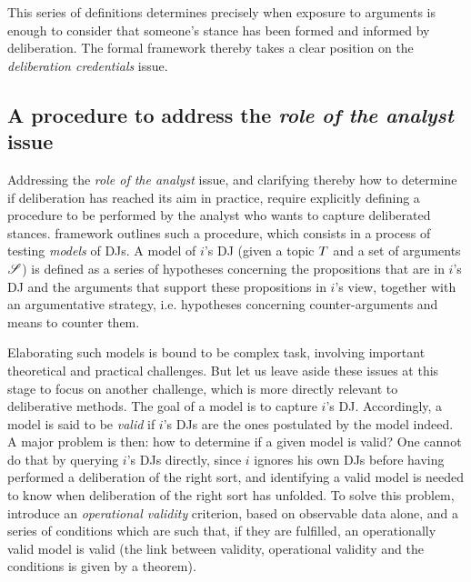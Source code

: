 \documentclass[version=3.21, pagesize, twoside=off, bibliography=totoc, DIV=calc, fontsize=12pt, a4paper, french, english]{scrartcl}
\begin{document}
{This series of definitions determines precisely when exposure to arguments is enough to consider that someone’s stance has been formed and informed by deliberation. The formal framework thereby takes a clear position on the \emph{deliberation credentials} issue.

\subsection{A procedure to address the \emph{role of the analyst} issue}
Addressing the \emph{role of the analyst} issue, and clarifying thereby how to determine if deliberation has reached its aim in practice,  require explicitly defining a procedure to be performed by the analyst who wants to capture deliberated stances.  framework outlines such a procedure, which consists in a process of testing \emph{models} of \acp{DJ}. A model of $i$'s \ac{DJ} (given a topic $T$ and a set of arguments $\mathscr{S}$) is defined as a series of hypotheses concerning the propositions that are in $i$'s \ac{DJ} and the arguments that support these propositions in $i$'s view, together with an argumentative strategy, i.e. hypotheses concerning counter-arguments and means to counter them.

Elaborating such models is bound to be complex task, involving important theoretical and practical challenges. But let us leave aside these issues at this stage to focus on another challenge, which is more directly relevant to deliberative methods. 
The goal of a model is to capture $i$'s \ac{DJ}. Accordingly, a model is said to be \emph{valid} if $i$’s \acp{DJ} are the ones postulated by the model indeed. A major problem is then: how to determine if a given model is valid?
One cannot do that by querying $i$'s \acp{DJ} directly, since $i$ ignores his own \acp{DJ} before having performed a deliberation of the right sort, and identifying a valid model is needed to know when deliberation of the right sort has unfolded. To solve this problem, \citet{cailloux_formal_2019} introduce an \emph{operational validity} criterion, based on observable data alone, and a series of conditions which are such that, if they are fulfilled, an operationally valid model is valid (the link between validity, operational validity and the conditions is given by a theorem).

}
\end{document}
